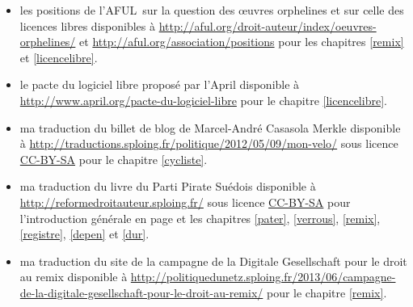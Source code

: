 \begin{itemize}
\item les positions de l'AFUL sur la question des œuvres orphelines et sur celle des licences libres disponibles à \url{http://aful.org/droit-auteur/index/oeuvres-orphelines/} et \url{http://aful.org/association/positions} pour les chapitres \ref{remix} et \ref{licencelibre}.
\item le pacte du logiciel libre proposé par l'April disponible à \url{http://www.april.org/pacte-du-logiciel-libre} pour le chapitre \ref{licencelibre}.
\item ma traduction du billet de blog  de Marcel-André Casasola Merkle disponible à \url{http://traductions.sploing.fr/politique/2012/05/09/mon-velo/} sous licence \href{http://creativecommons.org/licenses/by-sa/2.0/fr/}{CC-BY-SA} pour le chapitre \ref{cycliste}.
\item ma traduction du livre du Parti Pirate Suédois  disponible à \url{http://reformedroitauteur.sploing.fr/} sous licence \href{http://creativecommons.org/licenses/by-sa/2.0/fr/}{CC-BY-SA} pour l'introduction générale en page \pageref{premintro} et les chapitres \ref{pater}, \ref{verrous}, \ref{remix}, \ref{registre}, \ref{depen} et \ref{dur}. 
\item ma traduction du site de la campagne de la Digitale Gesellschaft pour le droit au remix disponible à \url{http://politiquedunetz.sploing.fr/2013/06/campagne-de-la-digitale-gesellschaft-pour-le-droit-au-remix/} pour le chapitre \ref{remix}.
\end{itemize}

\nocite{lessig2004culture}
\nocite{florent2004bon}
\nocite{benkler2009richesse}
\nocite{benkler2009richesse}
\nocite{manach2010vie}
\nocite{lessig2005avenir}
\nocite{raymond1998cathedrale}
\nocite{stallman2010richard}
\nocite{sagot2002propriete}
\nocite{perline2004bataille}
\nocite{aigrain2008internet}
\nocite{hadopi}
\nocite{opendata}
\nocite{smiers2011monde}

